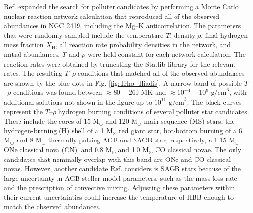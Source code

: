 Ref. \cite{Iliadis2016} expanded the search for polluter candidates by performing a Monte Carlo nuclear reaction network calculation that reproduced all of the observed abundances in NGC 2419, including the Mg--K anticorrelation. The parameters that were randomly sampled include the temperature $T$, density $\rho$, final hydrogen mass fraction $X_{\mathrm{H}}$, all reaction rate probability densities in the network, and initial abundances. $T$ and $\rho$ were held constant for each network calculation. The reaction rates were obtained by truncating the Starlib \cite{Sallaska2013} library for the relevant rates. The resulting $T$--$\rho$ conditions that matched all of the observed abundances are shown by the blue dots in Fig. \ref{fig:Trho_Iliadis}. A narrow band of possible $T$--$\rho$ conditions was found between $\approx80-260$ MK and $\approx10^{-4}-10^{8}$ $\mathrm{g/cm}^{3}$, with additional solutions not shown in the figure up to $10^{11}$ $\mathrm{g/cm}^{3}$. The black curves  represent the $T$--$\rho$ hydrogen burning conditions of several polluter star candidates. These include the cores of 15 $\mathrm{M}_{\odot}$ and 120 $\mathrm{M}_{\odot}$ main sequence (MS) stars, the hydrogen-burning (H) shell of a 1 $\mathrm{M}_{\odot}$ red giant star, hot-bottom burning of a 6 $\mathrm{M}_{\odot}$ and 8 $\mathrm{M}_{\odot}$ thermally-pulsing AGB and SAGB star, respectively, a 1.15 $\mathrm{M}_{\odot}$ ONe classical nova (CN), and 0.8 $\mathrm{M}_{\odot}$ and 1.0 $\mathrm{M}_{\odot}$ CO classical novae. The only candidates that nominally overlap with this band are ONe and CO classical novae. However, another candidate Ref. \cite{Iliadis2016} considers is SAGB stars because of the large uncertainty in AGB stellar model parameters, such as the mass loss rate and the prescription of convective mixing. Adjusting these parameters within their current uncertainties could increase the temperature of HBB enough to match the observed abundances.


